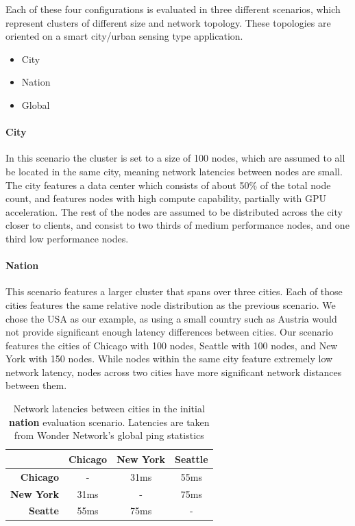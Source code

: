 \documentclass[draft,final]{vutinfth} %
\begin{document}
Each of these four configurations is evaluated in three different scenarios, which represent clusters of different size and network topology.
These topologies are oriented on a smart city/urban sensing type application.
\begin{itemize}
    \item City
    \item Nation
    \item Global
\end{itemize}
\paragraph{City}
In this scenario the cluster is set to a size of 100 nodes, which are assumed to all be located in the same city, meaning network latencies between nodes are small.
The city features a data center which consists of about 50\% of the total node count, and features nodes with high compute capability, partially with GPU acceleration.
The rest of the nodes are assumed to be distributed across the city closer to clients, and consist to two thirds of medium performance nodes, and one third low performance nodes.
\paragraph{Nation}
This scenario features a larger cluster that spans over three cities.
Each of those cities features the same relative node distribution as the previous scenario.
We chose the USA as our example, as using a small country such as Austria would not provide significant enough latency differences between cities.
Our scenario features the cities of Chicago with 100 nodes, Seattle with 100 nodes, and New York with 150 nodes.
While nodes within the same city feature extremely low network latency, nodes across two cities have more significant network distances between them.

 \begin{table}[]
\centering
\begin{tabular}{r|ccc}
\multicolumn{1}{c|}{} & \textbf{Chicago} & \textbf{New York} & \textbf{Seattle} \\ \hline
\textbf{Chicago}      & -                & 31ms              & 55ms             \\
\textbf{New York}     & 31ms             & -                 & 75ms             \\
\textbf{Seatte}       & 55ms             & 75ms              & -                \\ \hline
\end{tabular}
\caption{Network latencies between cities in the initial \textbf{nation} evaluation scenario. Latencies are taken from Wonder Network's global ping statistics\cite{wondernetworkGlobalPingStatistics}}
\label{tab:initial_nation_pings}
\end{table}
\end{document}
